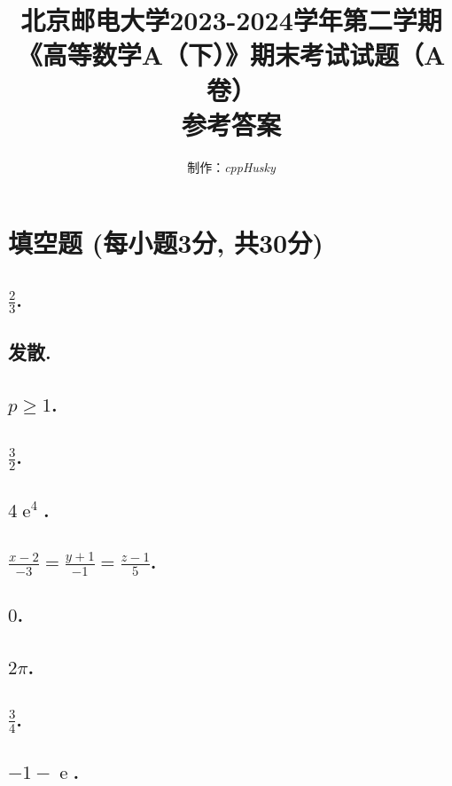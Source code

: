\documentclass[12pt]{ctexart}
\title{北京邮电大学2023-2024学年第二学期\\《高等数学A（下）》期末考试试题（A卷）\\参考答案}
\author{制作：\textit{cppHusky}}
\date{}
\DeclareMathOperator{\ee}{\mathrm{e}}
\begin{document}
\pagestyle{fancy}
\fancyhf{}
\maketitle
\thispagestyle{fancy}
\section{填空题 (每小题3分, 共30分)}
\subsection{\(\frac{2}{3}\).}
\subsection{发散.}
\subsection{\(p\ge1\).}
\subsection{\(\frac{3}{2}\).}
\subsection{\(4\ee^{4}\).}
\subsection{\(\frac{x-2}{-3}=\frac{y+1}{-1}=\frac{z-1}{5}\).}
\subsection{\(0\).}
\subsection{\(2\pi\).}
\subsection{\(\frac{3}{4}\).}
\subsection{\(-1-\ee\).}
\pagebreak
\end{document}
